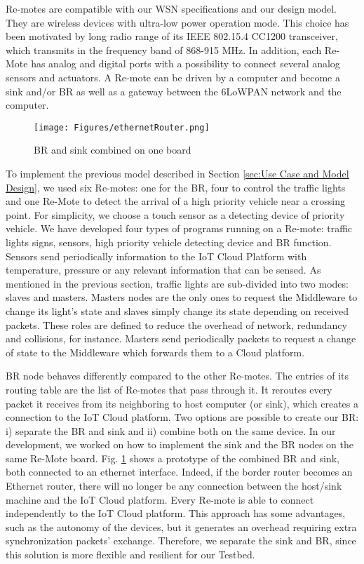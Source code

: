 Re-motes are compatible with our WSN specifications and our design model.
They are wireless devices with ultra-low power operation mode.
This choice has been motivated by long radio range of its IEEE 802.15.4 CC1200 transceiver,
	which transmits in the frequency band of 868-915 MHz.
In addition,
	each Re-Mote has analog and digital ports with a possibility to connect several analog sensors and actuators.
A Re-mote can be driven by a computer and become a sink and/or BR as well as a gateway between the 6LoWPAN network and the computer.

\begin{figure}[!htb]
\centering
\texttt{[image: Figures/ethernetRouter.png]}
\caption{BR and sink combined on one board}
\label{fig:ethernetRouter.png}
\end{figure}

To implement the previous model described in Section \ref{sec:Use Case and Model Design},
	we used six Re-motes:
	one for the BR,
	four to control the traffic lights and one Re-Mote to detect the arrival of a high priority vehicle near a crossing point.
For simplicity,
	we choose a touch sensor as a detecting device of priority vehicle.
We have developed four types of programs running on a Re-mote:
	traffic lights signs,
	sensors,
	high priority vehicle detecting device and BR function.
Sensors send periodically information to the IoT Cloud Platform with temperature,
	pressure or any relevant information that can be sensed.
As mentioned in the previous section,
	traffic lights are sub-divided into two modes:
	slaves and masters.
Masters nodes are the only ones to request the Middleware to change its light’s state and slaves simply change its state depending on received packets.
These roles are defined to reduce the overhead of network,
	redundancy and collisions,
	for instance.
Masters send periodically packets to request a change of state to the Middleware which forwards them to a Cloud platform.
 
BR node behaves differently compared to the other Re-motes.
The entries of its routing table are the list of Re-motes that pass through it.
It reroutes every packet it receives from its neighboring to host computer (or sink),
	which  creates a connection to the IoT Cloud platform.
Two options are possible to create our BR:
	i) separate the BR and sink and ii) combine both on the same device.
In our development,
	we worked on how to implement the sink and the BR nodes on the same Re-Mote board.
Fig.
\ref{fig:ethernetRouter.png} shows a prototype of the combined BR and sink,
	both connected to an ethernet interface.
Indeed,
	if the border router becomes an Ethernet router,
	there will no longer be any connection between the host/sink machine and the IoT Cloud platform.
Every Re-mote is able to connect independently to the IoT Cloud platform.
This approach has some advantages,
	such as the autonomy of the devices,
	but it generates an overhead requiring extra synchronization packets' exchange.
Therefore,
	we separate the sink and BR,
	since this solution is more flexible and resilient for our Testbed.

